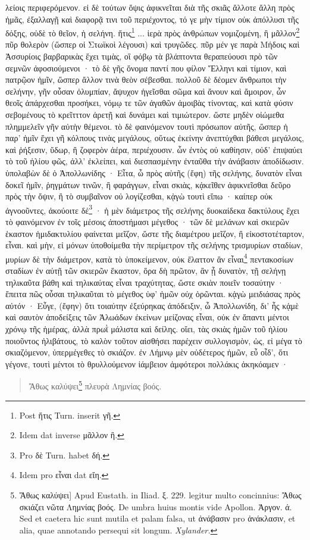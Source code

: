 \documentclass[a4paper, 11pt, oneside, polutonikogreek, german]{article}
\begin{document}
λείοις περιφερόμενον. εἰ δὲ τούτων ὄψις ἀφικνεῖται διὰ τῆς σκιᾶς ἄλλοτε ἄλλη πρὸς ἡμᾶς, ἐξαλλαγῇ καὶ διαφορᾷ τινι τοῦ περιέχοντος, τό γε μὴν τίμιον οὐκ ἀπόλλυσι τῆς δόξης, οὐδὲ τὸ θεῖον, ἡ σελήνη. ἥτις\footnote{Post ἥτις Turn. inserit γῆ.} ... ἱερὰ πρὸς ἀνθρώπων νομιζομένη, ἢ μᾶλλον\footnote{Idem dat inverse μᾶλλον ἢ.} πῦρ θολερὸν (ὥσπερ οἱ Στωϊκοὶ λέγουσι) καὶ τρυγῶδες. πῦρ μέν γε παρὰ Μήδοις καὶ Ἀσσυρίοις βαρβαρικὰς ἔχει τιμὰς, οἳ φόβῳ τὰ βλάπτοντα θεραπεύουσι πρὸ τῶν σεμνῶν ἀφοσιούμενοι · τὸ δὲ γῆς ὄνομα παντί που φίλον Ἕλληνι καὶ τίμιον, καὶ πατρῷον ἡμῖν, ὥσπερ ἄλλον τινὰ θεὸν σέβεσθαι. πολλοῦ δὲ δέομεν ἄνθρωποι τὴν σελήνην, γῆν οὖσαν ὀλυμπίαν, ἄψυχον ἡγεῖσθαι σῶμα καὶ ἄνουν καὶ ἄμοιρον, ὧν θεοῖς ἀπάρχεσθαι προσήκει, νόμῳ τε τῶν ἀγαθῶν ἀμοιβὰς τίνοντας, καὶ κατὰ φύσιν σεβομένους τὸ κρεῖτττον ἀρετῇ καὶ δυνάμει καὶ τιμιώτερον. ὥστε μηδὲν οἰώμεθα πλημμελεῖν γῆν αὐτὴν θέμενοι. τὸ δὲ φαινόμενον τουτὶ πρόσωπον αὐτῆς, ὥσπερ ἡ παρ' ἡμῖν ἔχει γῆ κόλπους τινὰς μεγάλους, οὕτως ἐκείνην ἀνεπτύχθαι βάθεσι μεγάλοις, καὶ ῥήξεσιν, ὕδωρ, ἢ ζοφερὸν ἀέρα, περιέχουσιν. ὧν ἐντὸς οὐ καθίησιν, οὐδ' ἐπιψαύει τὸ τοῦ ἡλίου φῶς, ἀλλ' ἐκλείπει, καὶ διεσπασμένην ἐνταῦθα τὴν ἀνάβασιν ἀποδίδωσιν. ὑπολαβὼν δὲ ὁ Ἀπολλωνίδης · Εἶτα, ὦ πρὸς αὐτῆς (ἔφη) τῆς σελήνης, δυνατὸν εἶναι δοκεῖ ἡμῖν, ῥηγμάτων τινῶν, ἢ φαράγγων, εἶναι σκιὰς, κᾀκεῖθεν ἀφικνεῖσθαι δεῦρο πρὸς τὴν ὄψιν, ἢ τὸ συμβαῖνον οὐ λογίζεσθαι, κᾀγὼ τουτὶ εἴπω · καίπερ οὐκ ἀγνοοῦντες, ἀκούοιτε δέ\footnote{Pro δὲ Turn. habet δή.} · ἡ μὲν διάμετρος τῆς σελήνης δυοκαίδεκα δακτύλους ἔχει τὸ φαινόμενον ἐν τοῖς μέσοις ἀποστήμασι μέγεθος · τῶν δὲ μελάνων καὶ σκιερῶν ἑκαστον ἡμιδακτυλίου φαίνεται μεῖζον, ὥστε τῆς διαμέτρου μεῖζον, ἢ εἰκοστοτέταρτον, εἶναι. καὶ μὴν, εἰ μόνων ὑποθοίμεθα τὴν περίμετρον τῆς σελήνης τρισμυρίων σταδίων, μυρίων δὲ τὴν διάμετρον, κατὰ τὸ ὑποκείμενον, οὐκ ἔλαττον ἂν εἶναι\footnote{Idem pro εἶναι dat εἴη.} πεντακοσίων σταδίων ἐν αὐτῇ τῶν σκιερῶν ἕκαστον, ὅρα δὴ πρῶτον, ἂν ᾖ δυνατὸν, τῇ σελήνῃ τηλικαῦτα βάθη καὶ τηλικαύτας εἶναι τραχύτητας, ὥστε σκιὰν ποιεῖν τοσαύτην · ἔπειτα πῶς οὖσαι τηλικαῦται τὸ μέγεθος ὑφ' ἡμῶν οὐχ ὁρῶνται. κᾀγὼ μειδιάσας πρὸς αὐτόν · Εὖγε, (ἔφην) ὅτι τοιαύτην ἐξεύρηκας ἀπόδειξιν, ὦ Ἀπολλωνίδη, δι' ἧς κᾀμὲ καὶ σαυτὸν ἀποδείξεις τῶν Ἀλωάδων ἐκείνων μείζονας εἶναι, οὐκ ἐν ἅπαντι μέντοι χρόνῳ τῆς ἡμέρας, ἀλλὰ πρωῒ μάλιστα καὶ δείλης. οἴει, τὰς σκιὰς ἡμῶν τοῦ ἡλίου ποιοῦντος ἠλιβάτους, τὸ καλὸν τοῦτον αἰσθήσει παρέχειν συλλογισμὸν, ὡς, εἰ μέγα τὸ σκιαζόμενον, ὑπερμέγεθες τὸ σκιάζον. ἐν Λήμνῳ μὲν οὐδέτερος ἡμῶν, εὖ οἶδ', ὅτι γέγονε, τουτὶ μέντοι τὸ θρυλλούμενον ἰάμβειον ἀμφότεροι πολλάκις ἀκηκόαμεν ·
\begin{quotation}
Ἄθως καλύψει\footnote{Ἄθως καλύψει] Apud Eustath. in Iliad. ξ. 229. legitur multo concinnius: Ἄθως σκιάζει νῶτα Λημνίας βοός. De umbra huius montis vide Apollon. Ἀργον. ά. Sed et caetera hic sunt mutila et palam falsa, ut ἀνάβασιν pro ἀνάκλασιν, et alia, quae annotando persequi sit longum. \emph{Xylander.}} πλευρὰ Λημνίας βοός.
\end{quotation}
\end{document}
